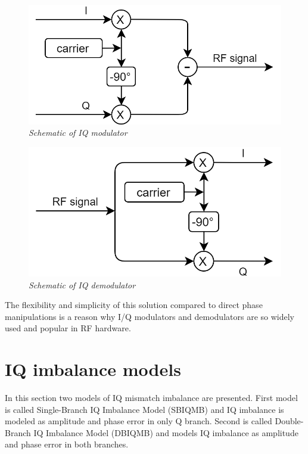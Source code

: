 \documentclass[en,printmode]{mgr}
\begin{document}
		\begin{figure}[!htb]
    		\centering
   			\includegraphics[width=\textwidth]{images/iqmod.png}
    		\caption{\textit{Schematic of IQ modulator}}
    		\label{fig:polarplot}
		\end{figure}
		\vspace{1cm}
		\begin{figure}[!htb]
    		\centering
   			\includegraphics[width=\textwidth]{images/iqdemod.png}
    		\caption{\textit{Schematic of IQ demodulator}}
    		\label{fig:polarplot}
		\end{figure}
		\newpage
		The flexibility and simplicity of this solution compared to direct phase manipulations
		is a reason why I/Q modulators and demodulators are so widely used and popular in RF hardware.
		
	\newpage
	\section{IQ imbalance models}
		In this section two models of IQ mismatch imbalance are presented. First model is called 
		Single-Branch IQ Imbalance Model (SBIQMB) and IQ imbalance is modeled as amplitude and phase
		error in only Q branch. Second is called Double-Branch IQ Imbalance Model (DBIQMB) and 
		models IQ imbalance as amplitude and phase error in both branches.
		
\end{document}
